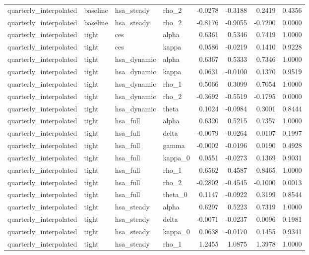 \begin{tabular}{llllrrrr}
quarterly\_interpolated & baseline & hsa\_steady & rho\_2 & -0.0278 & -0.3188 & 0.2419 & 0.4356 \\
quarterly\_interpolated & baseline & hsa\_steady & rho\_2 & -0.8176 & -0.9055 & -0.7200 & 0.0000 \\
quarterly\_interpolated & tight & ces & alpha & 0.6361 & 0.5346 & 0.7419 & 1.0000 \\
quarterly\_interpolated & tight & ces & kappa & 0.0586 & -0.0219 & 0.1410 & 0.9228 \\
quarterly\_interpolated & tight & hsa\_dynamic & alpha & 0.6367 & 0.5333 & 0.7346 & 1.0000 \\
quarterly\_interpolated & tight & hsa\_dynamic & kappa & 0.0631 & -0.0100 & 0.1370 & 0.9519 \\
quarterly\_interpolated & tight & hsa\_dynamic & rho\_1 & 0.5066 & 0.3099 & 0.7054 & 1.0000 \\
quarterly\_interpolated & tight & hsa\_dynamic & rho\_2 & -0.3692 & -0.5519 & -0.1795 & 0.0000 \\
quarterly\_interpolated & tight & hsa\_dynamic & theta & 0.1024 & -0.0984 & 0.3001 & 0.8444 \\
quarterly\_interpolated & tight & hsa\_full & alpha & 0.6320 & 0.5215 & 0.7357 & 1.0000 \\
quarterly\_interpolated & tight & hsa\_full & delta & -0.0079 & -0.0264 & 0.0107 & 0.1997 \\
quarterly\_interpolated & tight & hsa\_full & gamma & -0.0002 & -0.0196 & 0.0190 & 0.4928 \\
quarterly\_interpolated & tight & hsa\_full & kappa\_0 & 0.0551 & -0.0273 & 0.1369 & 0.9031 \\
quarterly\_interpolated & tight & hsa\_full & rho\_1 & 0.6562 & 0.4587 & 0.8465 & 1.0000 \\
quarterly\_interpolated & tight & hsa\_full & rho\_2 & -0.2802 & -0.4545 & -0.1000 & 0.0013 \\
quarterly\_interpolated & tight & hsa\_full & theta\_0 & 0.1147 & -0.0922 & 0.3199 & 0.8544 \\
quarterly\_interpolated & tight & hsa\_steady & alpha & 0.6297 & 0.5223 & 0.7319 & 1.0000 \\
quarterly\_interpolated & tight & hsa\_steady & delta & -0.0071 & -0.0237 & 0.0096 & 0.1981 \\
quarterly\_interpolated & tight & hsa\_steady & kappa\_0 & 0.0638 & -0.0170 & 0.1455 & 0.9341 \\
quarterly\_interpolated & tight & hsa\_steady & rho\_1 & 1.2455 & 1.0875 & 1.3978 & 1.0000 \\

\end{tabular}
